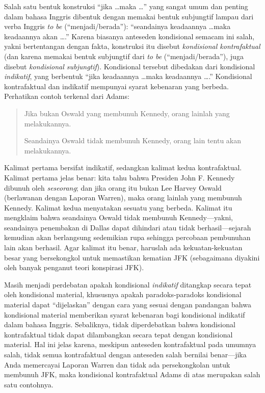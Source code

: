 \documentclass[../../../include/open-logic-section]{subfiles}
\begin{document}


Salah satu bentuk konstruksi ``jika \dots maka \dots'' yang sangat umum dan
penting dalam bahasa Inggris dibentuk dengan memakai bentuk subjungtif lampau
dari verba Inggris \emph{to be} (``menjadi/berada''): ``seandainya keadaannya \dots maka keadaannya akan
\dots.'' Karena biasanya anteseden kondisional semacam ini salah, yakni
bertentangan dengan fakta, konstruksi itu disebut \emph{kondisional
  kontrafaktual} (dan karena memakai bentuk subjungtif dari \emph{to be}
(``menjadi/berada''), juga
disebut \emph{kondisional subjungtif}). Kondisional tersebut dibedakan dari
kondisional \emph{indikatif}, yang berbentuk ``jika keadaannya \dots maka
keadaannya \dots.'' Kondisional kontrafaktual dan indikatif mempunyai syarat
kebenaran yang berbeda. Perhatikan contoh terkenal dari Adams:
\begin{quote}
  Jika bukan Oswald yang membunuh Kennedy, orang lainlah yang melakukannya.

  Seandainya Oswald tidak membunuh Kennedy, orang lain tentu akan
  melakukannya.
\end{quote}
Kalimat pertama bersifat indikatif, sedangkan kalimat kedua kontrafaktual.
Kalimat pertama jelas benar: kita tahu bahwa Presiden John F. Kennedy dibunuh
oleh \emph{seseorang}; dan jika orang itu bukan Lee Harvey Oswald (berlawanan
dengan Laporan Warren), maka orang lainlah yang membunuh Kennedy. Kalimat
kedua menyatakan sesuatu yang berbeda. Kalimat itu mengklaim bahwa seandainya
Oswald tidak membunuh Kennedy---yakni, seandainya penembakan di Dallas dapat
dihindari atau tidak berhasil---sejarah kemudian akan berlangsung sedemikian
rupa sehingga percobaan pembunuhan lain akan berhasil. Agar kalimat itu benar,
haruslah ada kekuatan-kekuatan besar yang bersekongkol untuk memastikan
kematian JFK (sebagaimana diyakini oleh banyak penganut teori konspirasi JFK).

Masih menjadi perdebatan apakah kondisional \emph{indikatif} ditangkap secara
tepat oleh kondisional material, khususnya apakah paradoks-paradoks kondisional
material dapat ``dijelaskan'' dengan cara yang sesuai dengan pandangan bahwa
kondisional material memberikan syarat kebenaran bagi kondisional indikatif
dalam bahasa Inggris. Sebaliknya, tidak diperdebatkan bahwa kondisional
kontrafaktual tidak dapat dilambangkan secara tepat dengan kondisional
material. Hal ini jelas karena, meskipun anteseden kontrafaktual pada umumnya
salah, tidak semua kontrafaktual dengan anteseden salah bernilai benar---jika
Anda memercayai Laporan Warren dan tidak ada persekongkolan untuk membunuh JFK,
maka kondisional kontrafaktual Adams di atas merupakan salah satu contohnya.
\end{document}
